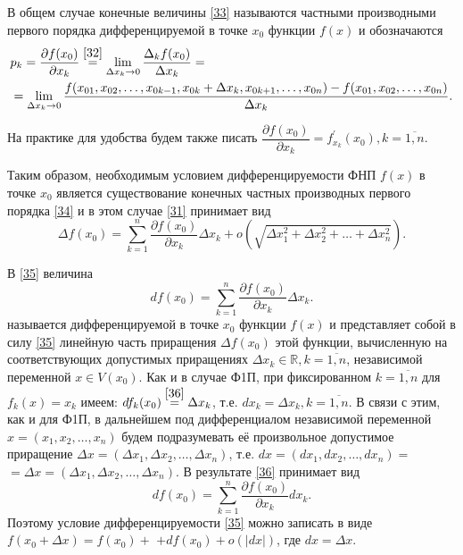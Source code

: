 В общем случае конечные величины \eqref{33} называются частными производными первого порядка дифференцируемой в точке $x_0$ функции $f(x)$ и обозначаются
\begin{equation}
\label{34}
\begin{split}
& p_k = \dfrac{\partial f(x_0)}{\partial x_k} \overset{\eqref{32}}{=} \lim\limits_{\Delta x_k \to 0} \dfrac{\Delta_k f(x_0)}{\Delta x_k} = \\
& = \lim\limits_{\Delta x_k \to 0} \dfrac{f(x_{01}, x_{02}, \ldots, x_{0k-1}, x_{0k} + \Delta x_k, x_{0k+1}, \ldots, x_{0n})  - f(x_{01}, x_{02}, \ldots, x_{0n})}{\Delta x_k}.
\end{split}
\end{equation}

На практике для удобства будем также писать $\dfrac{\partial f(x_0)}{\partial x_k} = f_{x_k} ^{'} (x_0), k = \overline{1, n}$.

Таким образом, необходимым условием дифференцируемости ФНП $f(x)$ в точке $x_0$ является существование конечных частных производных первого порядка \eqref{34} и в этом случае \eqref{31} принимает вид
\begin{equation}
\label{35}
\Delta f(x_0) = \sum_{k=1}^{n} \dfrac{\partial f(x_0)}{\partial x_k} \Delta x_k + o \left(\sqrt{\Delta x_1^2 + \Delta x_2^2 + \ldots + \Delta x_n^2}\right).
\end{equation}

В \eqref{35} величина 
\begin{equation}
\label{36}
d f(x_0) = \sum\limits_{k=1}^{n} \dfrac{\partial f(x_0)}{\partial x_k} \Delta x_k.
\end{equation}
называется  дифференцируемой в точке $x_0$ функции $f(x)$ и представляет собой в силу \eqref{35} линейную часть приращения $\Delta f(x_0)$ этой функции, вычисленную на соответствующих допустимых приращениях $\Delta x_k \in \mathbb{R}, k = \overline{1,n}$, независимой переменной $x \in V(x_0)$. Как и в случае Ф1П, при фиксированном $k = \overline{1,n}$ для $f_k(x) = x_k$ имеем: $d f_k(x_0) \overset{\eqref{36}}{=} \Delta x_k$, т.е. $d x_k = \Delta x_k, k = \overline{1,n}$. В связи с этим, как и для Ф1П, в дальнейшем под дифференциалом независимой переменной $x = (x_1, x_2, \ldots, x_n)$ будем подразумевать её произвольное допустимое приращение $\Delta x = (\Delta x_1, \Delta x_2, \ldots, \Delta x_n)$, т.е. $dx = (dx_1, dx_2, \ldots, dx_n) = $ \\
$ = \Delta x = (\Delta x_1, \Delta x_2, \ldots, \Delta x_n)$. В результате \eqref{36} принимает вид 
\begin{equation}
\label{37}
d f(x_0) = \sum\limits_{k=1}^{n} \dfrac{\partial f(x_0)}{\partial x_k} dx_k.
\end{equation}
Поэтому условие дифференцируемости \eqref{35} можно записать в виде $f(x_0 + \Delta x) = f(x_0) +$ $+	 df(x_0) + o(|dx|)$, где $d x = \Delta x$. 

